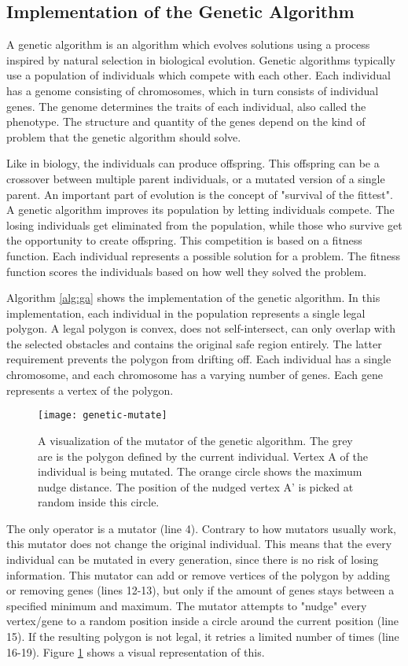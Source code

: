 \subsection{Implementation of the Genetic Algorithm}
A genetic algorithm is an algorithm which evolves solutions using a process inspired by natural selection in biological evolution. Genetic algorithms typically use a population of individuals which compete with each other. Each individual has a genome consisting of chromosomes, which in turn consists of individual genes. The genome determines the traits of each individual, also called the phenotype. The structure and quantity of the genes depend on the kind of problem that the genetic algorithm should solve. 
\par
Like in biology, the individuals can produce offspring. This offspring can be a crossover between multiple parent individuals, or a mutated version of a single parent. An important part of evolution is the concept of "survival of the fittest". A genetic algorithm improves its population by letting individuals compete. The losing individuals get eliminated from the population, while those who survive get the opportunity to create offspring. This competition is based on a fitness function. Each individual represents a possible solution for a problem. The fitness function scores the individuals based on how well they solved the problem.
\par
Algorithm \ref{alg:ga} shows the implementation of the genetic algorithm. In this implementation, each individual in the population represents a single legal polygon. A legal polygon is convex, does not self-intersect, can only overlap with the selected obstacles and contains the original safe region entirely. The latter requirement prevents the polygon from drifting off. Each individual has a single chromosome, and each chromosome has a varying number of genes. Each gene represents a vertex of the polygon.
\par
\begin{figure}[h]
\centering
\texttt{[image: genetic-mutate]}
\caption[A visualization of the mutator of the genetic algorithm]{A visualization of the mutator of the genetic algorithm. The grey are is the polygon defined by the current individual. Vertex A of the individual is being mutated. The orange circle shows the maximum nudge distance. The position of the nudged vertex A' is picked at random inside this circle.}
\label{fig:genetic-mutate}
\end{figure}
The only operator is a mutator (line 4). Contrary to how mutators usually work, this mutator does not change the original individual. This means that the every individual can be mutated in every generation, since there is no risk of losing information. This mutator can add or remove vertices of the polygon by adding or removing genes (lines 12-13), but only if the amount of genes stays between a specified minimum and maximum. The mutator attempts to "nudge" every vertex/gene to a random position inside a circle around the current position (line 15). If the resulting polygon is not legal, it retries a limited number of times (line 16-19). Figure \ref{fig:genetic-mutate} shows a visual representation of this.
